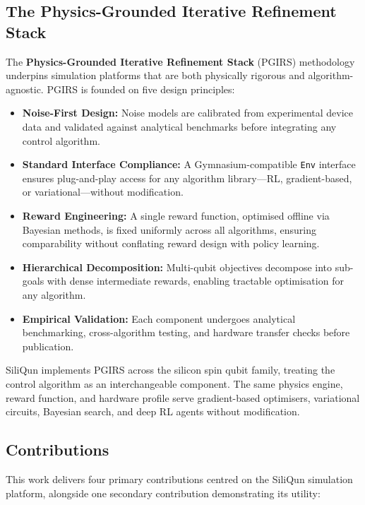 \subsection{The Physics-Grounded Iterative Refinement Stack}
\label{subsec:intro_pgirs}

The \textbf{Physics-Grounded Iterative Refinement Stack} (PGIRS) methodology underpins simulation platforms that are both physically rigorous and algorithm-agnostic. PGIRS is founded on five design principles:

\begin{itemize}
  \item \textbf{Noise-First Design:} Noise models are calibrated from experimental device data and validated against analytical benchmarks before integrating any control algorithm.
  \item \textbf{Standard Interface Compliance:} A Gymnasium-compatible \texttt{Env} interface ensures plug-and-play access for any algorithm library—RL, gradient-based, or variational—without modification.
  \item \textbf{Reward Engineering:} A single reward function, optimised offline via Bayesian methods, is fixed uniformly across all algorithms, ensuring comparability without conflating reward design with policy learning.
  \item \textbf{Hierarchical Decomposition:} Multi-qubit objectives decompose into sub-goals with dense intermediate rewards, enabling tractable optimisation for any algorithm.
  \item \textbf{Empirical Validation:} Each component undergoes analytical benchmarking, cross-algorithm testing, and hardware transfer checks before publication.
\end{itemize}

SiliQun implements PGIRS across the silicon spin qubit family, treating the control algorithm as an interchangeable component. The same physics engine, reward function, and hardware profile serve gradient-based optimisers, variational circuits, Bayesian search, and deep RL agents without modification.

\subsection{Contributions}
\label{subsec:contributions}

This work delivers four primary contributions centred on the SiliQun simulation platform, alongside one secondary contribution demonstrating its utility:

